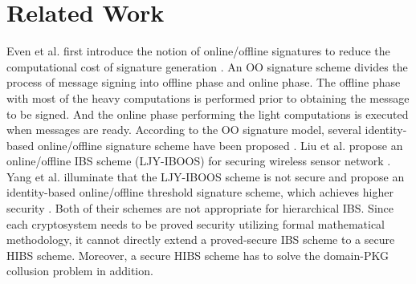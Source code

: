 \documentclass[times]{secauth}
\theoremstyle{definition}
\theoremstyle{remark}
\begin{document}
\section{Related Work} \label{sec-relatedwork}
Even et al. first introduce the notion of online/offline signatures to reduce the computational cost of signature generation \cite{even1990line}.
An OO signature scheme divides the process of message signing into offline phase and online phase.
The offline phase with most of the heavy computations is performed prior to obtaining the message to be signed.
And the online phase performing the light computations is executed when messages are ready.
According to the OO signature model, several identity-based online/offline signature scheme have been proposed \cite{liu2011online,yasmin2010authentication,liu2010efficient,kar2014provably}.
Liu et al. propose an online/offline IBS scheme (LJY-IBOOS) for securing wireless sensor network \cite{liu2010efficient}.
Yang et al. illuminate that the LJY-IBOOS scheme is not secure and propose an identity-based online/offline threshold signature scheme, which achieves higher security \cite{yang2013id}.
Both of their schemes are not appropriate for hierarchical IBS.
Since each cryptosystem needs to be proved security utilizing formal mathematical methodology, it cannot directly extend a proved-secure IBS scheme to a secure HIBS scheme.
Moreover, a secure HIBS scheme has to solve the domain-PKG collusion problem in addition. 
\par
\end{document}

